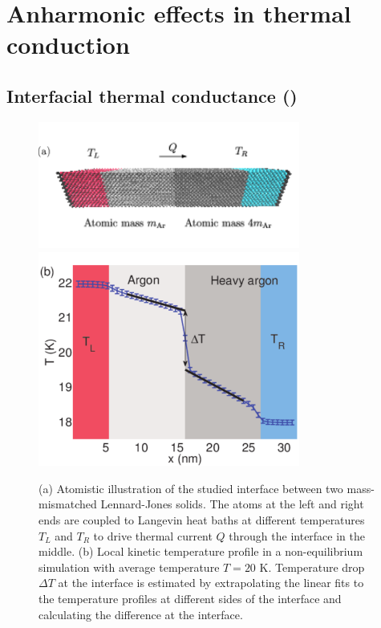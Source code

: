 

\section{Anharmonic effects in thermal conduction}

\subsection{Interfacial thermal conductance ()}

\begin{figure}[tb]
 \begin{center}
  \includegraphics[width=8.6cm]{pics/nemd_fig2a.pdf}
  \includegraphics[width=8.6cm]{pics/nemd_fig2b.pdf}
  \caption{(a) Atomistic illustration of the studied interface between two mass-mismatched Lennard-Jones solids. The atoms at the left and right ends are coupled to Langevin heat baths at different temperatures $T_L$ and $T_R$ to drive thermal current $Q$ through the interface in the middle. (b) Local kinetic temperature profile in a non-equilibrium simulation with average temperature $T=20$ K. Temperature drop $\Delta T$ at the interface is estimated by extrapolating the linear fits to the temperature profiles at different sides of the interface and calculating the difference at the interface. } 
 \label{fig:nemd_fig1}
 \end{center}
\end{figure}

